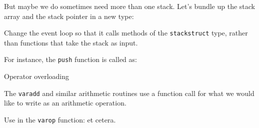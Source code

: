 But maybe we do sometimes need more than one stack.
Let's bundle up the stack array and the stack pointer
in a new type:
%

\begin{exercise}
  \label{ex:f-stack-push}
  Change the event loop so that it calls methods
  of the \lstinline{stackstruct} type,
  rather than functions that take the stack as input.

  For instance, the \lstinline{push} function is called as:
\end{exercise}


 {Operator overloading}

The \lstinline{varadd} and similar arithmetic routines
use a function call for what we would like to write
as an arithmetic operation.

\begin{exercise}
  Use  in the \lstinline{varop} function:
  et cetera.  
\end{exercise}
